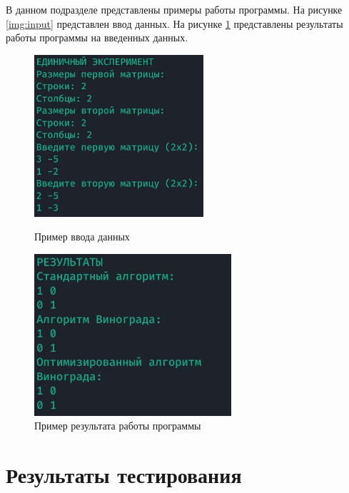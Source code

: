 В данном подразделе представлены примеры работы программы. На рисунке
\ref{img:input} представлен ввод данных. На рисунке \ref{img:output}
представлены результаты работы программы на введенных данных.
\noindent
\begin{figure}[ht!]
\begin{center}
    \begin{minipage}[h]{0.4\linewidth}
        \begin{center}
            \includegraphics[height=6cm]{../data/img/input.jpg}
            \caption{Пример ввода данных}
            \label{img:input}
        \end{center}
    \end{minipage}
    \hspace{2ex}
    \begin{minipage}[h]{0.4\linewidth}
        \begin{center}
            \includegraphics[height=6cm]{../data/img/output.jpg}
            \caption{Пример результата работы программы}
            \label{img:output}
        \end{center}
    \end{minipage}
\end{center}
\end{figure}

\section{Результаты тестирования}

